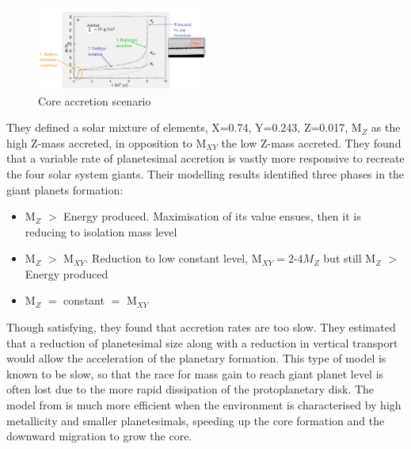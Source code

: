 \documentclass[12pt]{article} %
\begin{document}
\begin{figure}
\begin{center}
 \includegraphics[width=0.5\textwidth,keepaspectratio=true]{./images/pollack1996}
 \caption{Core accretion scenario \cite{pollack1996formation}}
 \label{pollack1996}
\end{center}
\end{figure}

\noindent They defined a solar mixture of elements, X=0.74, Y=0.243, Z=0.017, M$_Z$ as the high Z-mass accreted, in opposition to M$_{XY}$ the low Z-mass accreted. They found that a variable rate of planetesimal accretion \cite{lissauer1987timescales} is vastly more responsive to recreate the four solar system giants. Their modelling results identified three phases in the giant planets formation:

\begin{itemize}
\setlength\itemsep{0em}
\item M$_Z$ $>$ Energy produced. Maximisation of its value ensues, then it is reducing to isolation mass level
\item M$_Z$ $>$ M$_{XY}$. Reduction to low constant level, M$_{XY} = 2$-$4 M_Z$ but still M$_Z$ $>$ Energy produced
\item M$_Z$ $=$ constant $=$ M$_{XY}$
\end{itemize}

\noindent Though satisfying, they found that accretion rates are too slow. They estimated that a reduction of planetesimal size along with a reduction in vertical transport would allow the acceleration of the planetary formation. This type of model is known to be slow, so that the race for mass gain to reach giant planet level is often lost due to the more rapid dissipation of the protoplanetary disk. The model from \cite{pollack1996formation} is much more efficient when the environment is characterised by high metallicity and smaller planetesimals, speeding up the core formation and the downward migration to grow the core.
\end{document}
